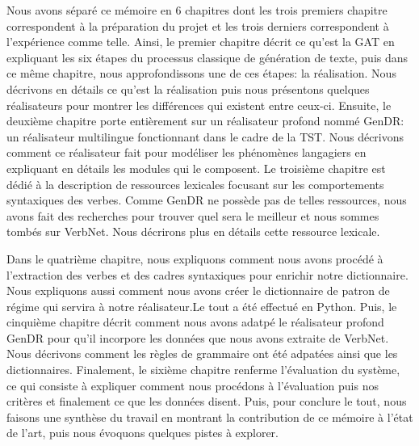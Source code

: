 Nous avons séparé ce mémoire en 6 chapitres dont les trois premiers chapitre correspondent à la préparation du projet et les trois derniers correspondent à l'expérience comme telle. Ainsi, le premier chapitre décrit ce qu'est la \ac{GAT} en expliquant les six étapes du processus classique de génération de texte, puis dans ce même chapitre, nous approfondissons une de ces étapes: la réalisation. Nous décrivons en détails ce qu'est la réalisation puis nous présentons quelques réalisateurs pour montrer les différences qui existent entre ceux-ci. Ensuite, le deuxième chapitre porte entièrement sur un réalisateur profond nommé GenDR: un réalisateur multilingue fonctionnant dans le cadre de la \ac{TST}. Nous décrivons comment ce réalisateur fait pour modéliser les phénomènes langagiers en expliquant en détails les modules qui le composent. Le troisième chapitre est dédié à la description de ressources lexicales focusant sur les comportements syntaxiques des verbes. Comme GenDR ne possède pas de telles ressources, nous avons fait des recherches pour trouver quel sera le meilleur et nous sommes tombés sur VerbNet. Nous décrirons plus en détails cette ressource lexicale.

Dans le quatrième chapitre, nous expliquons comment nous avons procédé à l'extraction des verbes et des cadres syntaxiques pour enrichir notre dictionnaire. Nous expliquons aussi comment nous avons créer le dictionnaire de patron de régime qui servira à notre réalisateur.Le tout a été effectué en Python. Puis, le cinquième chapitre décrit comment nous avons adatpé le réalisateur profond GenDR pour qu'il incorpore les données que nous avons extraite de VerbNet. Nous décrivons comment les règles de grammaire ont été adpatées ainsi que les dictionnaires. Finalement, le sixième chapitre renferme l'évaluation du système, ce qui consiste à expliquer comment nous procédons à l'évaluation puis nos critères et finalement ce que les données disent. Puis, pour conclure le tout, nous faisons une synthèse du travail en montrant la contribution de ce mémoire à l'état de l'art, puis nous évoquons quelques pistes à explorer.

